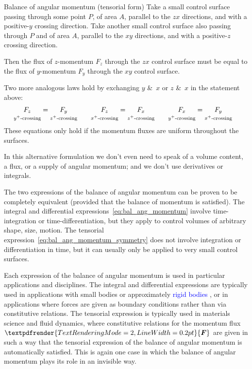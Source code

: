 \documentclass[a4paper,12pt,%
onecolumn,oneside,%
british%
]{memoir}
\newcommand*{\amp}{\&}
\renewcommand*{\bm}[1]{\textpdfrender{TextRenderingMode=2,LineWidth=0.2pt}{\boldsymbol{#1}}}
\renewcommand*{\|}[1][]{\nonscript\:#1\vert\nonscript\:\mathopen{}}
\newcommand*{\sect}{\S}%
\renewcommand*{\autoref}[3][\sect\,\ref]{\textcolor{blue}{#3}
\raisebox{0.6ex}{\color{blue}\miniscule%
\faIcon{angle-right}%
\;#1{#2}\;p.\,\pageref{#2}}}
\newcommand*{\yF}{\bm{F}}
\begin{document}
\begin{definition}{Balance of angular momentum (tensorial form)}
  Take a small control surface passing through some point $P$, of area $A$, parallel to the $zx$ directions, and with a positive-$y$ crossing direction. Take another small control surface also passing through $P$ and of area $A$, parallel to the $xy$ directions, and with a positive-$z$ crossing direction.

  \smallskip

  Then the flux of $z$-momentum $F_{z}$ through the $zx$ control surface must be equal to the flux of $y$-momentum $F_{y}$ through the $xy$ control surface.

\smallskip

  Two more analogous laws hold by exchanging $y$ \amp\ $x$ or $z$ \amp\ $x$ in the statement above:
  \begin{equation}
    \label{eq:bal_ang_momentum_symmetry}
    \begin{aligned}
      \underbracket[0pt]{\smash{F_{z}}}_{\text{$y^{+}$-crossing}}
      &=
      \underbracket[0pt]{\smash{F_{y}}}_{\text{$z^{+}$-crossing}}
&\quad
      \underbracket[0pt]{\smash{F_{z}}}_{\text{$x^{+}$-crossing}}
      &=
      \underbracket[0pt]{\smash{F_{x}}}_{\text{$z^{+}$-crossing}}
&\quad
      \underbracket[0pt]{\smash{F_{x}}}_{\text{$y^{+}$-crossing}}
      &=
      \underbracket[0pt]{\smash{F_{y}}}_{\text{$x^{+}$-crossing}}
    \end{aligned}
  \end{equation}
  These equations only hold if the momentum fluxes are uniform throughout the surfaces.
\end{definition}
In this alternative formulation we don't even need to speak of a volume content, a flux, or a supply of angular momentum; and we don't use derivatives or integrals.

The two expressions of the balance of angular momentum can be proven to be completely equivalent (provided that the balance of momentum is satisfied). The integral and differential expressions~\eqref{eq:bal_ang_momentum} involve time-integration or time-differentiation, but they apply to control volumes of arbitrary shape, size, motion. The tensorial expression~\eqref{eq:bal_ang_momentum_symmetry} does not involve integration or differentiation in time, but it can usually only be applied to very small control surfaces.

Each expression of the balance of angular momentum is used in particular applications and disciplines. The integral and differential expressions are typically used in applications with small bodies or approximately \autoref{sec:rigid_bodies}{rigid bodies}, or in applications where forces are given as boundary conditions rather than via constitutive relations. The tensorial expression is typically used in materials science and fluid dynamics, where constitutive relations for the momentum flux $\yF$ are given in such a way that the tensorial expression of the balance of angular momentum is automatically satisfied. This is again one case in which the balance of angular momentum plays its role in an invisible way.
\end{document}

